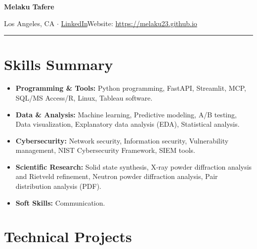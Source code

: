 \documentclass[11pt,a4paper]{article}
\begin{document}
\pagestyle{empty}




\begin{center}

    {\LARGE \textbf{Melaku Tafere}} \\

    \vspace{4pt}

    Los Angeles, CA $\cdot$ \href{https://www.linkedin.com/in/melakutafere23/}{LinkedIn}\quad Website: \href{https://melaku23.github.io}{https://melaku23.github.io}
\end{center}


\noindent\rule{\linewidth}{0.4pt}


\section*{\textbf{Skills Summary}}

\begin{itemize}[noitemsep, itemsep=4pt, leftmargin=*]

    \item \textbf{Programming \& Tools:} Python programming, FastAPI, Streamlit, MCP, SQL/MS Access/R, Linux, Tableau software.

    \item \textbf{Data \& Analysis:} Machine learning, Predictive modeling, A/B testing, Data visualization, Explanatory data analysis (EDA), Statistical analysis.

    \item \textbf{Cybersecurity:} Network security, Information security, Vulnerability management, NIST Cybersecurity Framework, SIEM tools.

    \item \textbf{Scientific Research:} Solid state synthesis, X-ray powder diffraction analysis and Rietveld refinement, Neutron powder diffraction analysis, Pair distribution analysis (PDF).

    \item \textbf{Soft Skills:} Communication.

\end{itemize}




\section*{\textbf{Technical Projects}}
\end{document}
